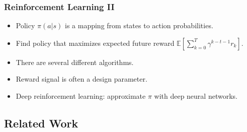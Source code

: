 \begin{frame}
    \frametitle{Reinforcement Learning II}

    \begin{itemize}
        \item Policy \(\pi(a|s)\) is a mapping from states to action probabilities.
        \item Find policy that maximizes expected future reward \(\mathbb{E} \left\lbrack \sum_{k=0}^{T} \gamma^{k-t-1} r_k \right\rbrack\).
        \item There are several different algorithms.
        \item Reward signal is often a design parameter.
        \item Deep reinforcement learning: approximate \(\pi\) with deep neural networks.
    \end{itemize}

\end{frame}

\subsection{Related Work}

